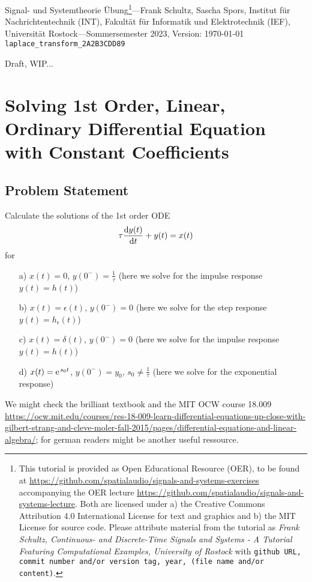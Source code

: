 \documentclass[11pt,a4paper,DIV=12]{scrartcl}
\begin{document}
%
\noindent Signal- und Systemtheorie Übung\footnote{This tutorial is provided as
Open Educational Resource (OER), to be found at
\url{https://github.com/spatialaudio/signals-and-systems-exercises}
accompanying the OER lecture
\url{https://github.com/spatialaudio/signals-and-systems-lecture}.
%
Both are licensed under a) the Creative Commons Attribution 4.0 International
License for text and graphics and b) the MIT License for source code.
%
Please attribute material from the tutorial as \textit{Frank Schultz,
Continuous- and Discrete-Time Signals and Systems - A Tutorial Featuring
Computational Examples, University of Rostock} with
\texttt{github URL, commit number and/or version tag, year, (file name and/or
content)}.}---Frank Schultz, Sascha Spors,
Institut für Nachrichtentechnik (INT),
Fakultät für Informatik und Elektrotechnik (IEF),
Universität Rostock---Sommersemester 2023, Version: \today\\
\verb|laplace_transform_2A2B3CDD89|

Draft, WIP...

\tableofcontents

\section{Solving 1st Order, Linear, Ordinary Differential Equation with
Constant Coefficients}
\subsection{Problem Statement}

Calculate the solutions of the 1st order ODE
\begin{align}
\tau \frac{\mathrm{d} y(t)}{\mathrm{d} t} + y(t) = x(t)
\end{align}
for
\begin{itemize}
\item[a)] $x(t) = 0$, $y(0^-)=\frac{1}{\tau}$ (here we solve for the impulse response $y(t)=h(t)$)
\item[b)] $x(t) = \epsilon(t)$, $y(0^-)=0$ (here we solve for the step response $y(t)=h_\epsilon(t)$)
\item[c)] $x(t) = \delta(t)$, $y(0^-)=0$ (here we solve for the impulse response $y(t)=h(t)$)
\item[d)] $x(t) = \e^{s_0 t}$, $y(0^-)=y_0$, $s_0 \neq \frac{1}{\tau}$ (here we solve for the exponential response)
\end{itemize}

We might check the brilliant textbook \cite{Strang2014} and the MIT OCW course 18.009 \url{https://ocw.mit.edu/courses/res-18-009-learn-differential-equations-up-close-with-gilbert-strang-and-cleve-moler-fall-2015/pages/differential-equations-and-linear-algebra/}; for german readers \cite{Burg2013} might be another useful ressource.
\end{document}
